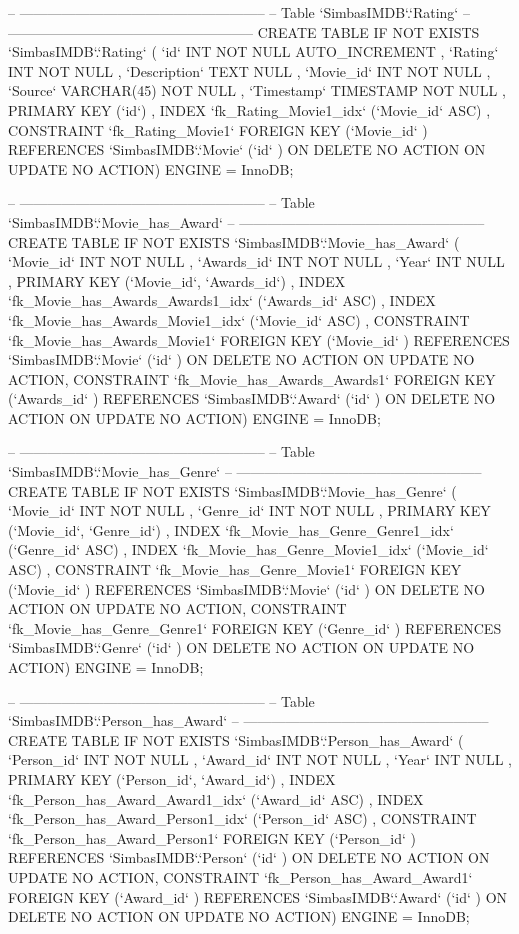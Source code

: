 \begin{spverbatim}
-- -----------------------------------------------------
-- Table `SimbasIMDB`.`Rating`
-- -----------------------------------------------------
CREATE  TABLE IF NOT EXISTS `SimbasIMDB`.`Rating` (
  `id` INT NOT NULL AUTO_INCREMENT ,
  `Rating` INT NOT NULL ,
  `Description` TEXT NULL ,
  `Movie_id` INT NOT NULL ,
  `Source` VARCHAR(45) NOT NULL ,
  `Timestamp` TIMESTAMP NOT NULL ,
  PRIMARY KEY (`id`) ,
  INDEX `fk_Rating_Movie1_idx` (`Movie_id` ASC) ,
  CONSTRAINT `fk_Rating_Movie1`
    FOREIGN KEY (`Movie_id` )
    REFERENCES `SimbasIMDB`.`Movie` (`id` )
    ON DELETE NO ACTION
    ON UPDATE NO ACTION)
ENGINE = InnoDB;


-- -----------------------------------------------------
-- Table `SimbasIMDB`.`Movie_has_Award`
-- -----------------------------------------------------
CREATE  TABLE IF NOT EXISTS `SimbasIMDB`.`Movie_has_Award` (
  `Movie_id` INT NOT NULL ,
  `Awards_id` INT NOT NULL ,
  `Year` INT NULL ,
  PRIMARY KEY (`Movie_id`, `Awards_id`) ,
  INDEX `fk_Movie_has_Awards_Awards1_idx` (`Awards_id` ASC) ,
  INDEX `fk_Movie_has_Awards_Movie1_idx` (`Movie_id` ASC) ,
  CONSTRAINT `fk_Movie_has_Awards_Movie1`
    FOREIGN KEY (`Movie_id` )
    REFERENCES `SimbasIMDB`.`Movie` (`id` )
    ON DELETE NO ACTION
    ON UPDATE NO ACTION,
  CONSTRAINT `fk_Movie_has_Awards_Awards1`
    FOREIGN KEY (`Awards_id` )
    REFERENCES `SimbasIMDB`.`Award` (`id` )
    ON DELETE NO ACTION
    ON UPDATE NO ACTION)
ENGINE = InnoDB;


-- -----------------------------------------------------
-- Table `SimbasIMDB`.`Movie_has_Genre`
-- -----------------------------------------------------
CREATE  TABLE IF NOT EXISTS `SimbasIMDB`.`Movie_has_Genre` (
  `Movie_id` INT NOT NULL ,
  `Genre_id` INT NOT NULL ,
  PRIMARY KEY (`Movie_id`, `Genre_id`) ,
  INDEX `fk_Movie_has_Genre_Genre1_idx` (`Genre_id` ASC) ,
  INDEX `fk_Movie_has_Genre_Movie1_idx` (`Movie_id` ASC) ,
  CONSTRAINT `fk_Movie_has_Genre_Movie1`
    FOREIGN KEY (`Movie_id` )
    REFERENCES `SimbasIMDB`.`Movie` (`id` )
    ON DELETE NO ACTION
    ON UPDATE NO ACTION,
  CONSTRAINT `fk_Movie_has_Genre_Genre1`
    FOREIGN KEY (`Genre_id` )
    REFERENCES `SimbasIMDB`.`Genre` (`id` )
    ON DELETE NO ACTION
    ON UPDATE NO ACTION)
ENGINE = InnoDB;


-- -----------------------------------------------------
-- Table `SimbasIMDB`.`Person_has_Award`
-- -----------------------------------------------------
CREATE  TABLE IF NOT EXISTS `SimbasIMDB`.`Person_has_Award` (
  `Person_id` INT NOT NULL ,
  `Award_id` INT NOT NULL ,
  `Year` INT NULL ,
  PRIMARY KEY (`Person_id`, `Award_id`) ,
  INDEX `fk_Person_has_Award_Award1_idx` (`Award_id` ASC) ,
  INDEX `fk_Person_has_Award_Person1_idx` (`Person_id` ASC) ,
  CONSTRAINT `fk_Person_has_Award_Person1`
    FOREIGN KEY (`Person_id` )
    REFERENCES `SimbasIMDB`.`Person` (`id` )
    ON DELETE NO ACTION
    ON UPDATE NO ACTION,
  CONSTRAINT `fk_Person_has_Award_Award1`
    FOREIGN KEY (`Award_id` )
    REFERENCES `SimbasIMDB`.`Award` (`id` )
    ON DELETE NO ACTION
    ON UPDATE NO ACTION)
ENGINE = InnoDB;



\end{spverbatim}
